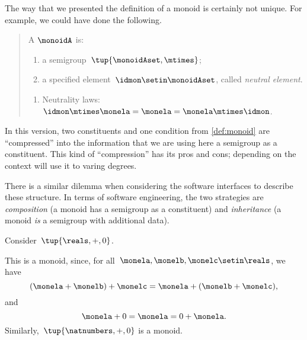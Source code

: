 \begin{remark}
    The way that we presented the definition of a monoid is certainly not unique.
    For example, we could have done the following.
    \begin{quote}
        A \emph{} $\monoidA$ is:
        \begin{body}
            \constit
            \begin{enumerate}
                \item a semigroup~$\tup{\monoidAset, \mtimes}$;
                \item a specified element~$\idmon\setin \monoidAset$, called \emph{neutral element}.
            \end{enumerate}
            \condit
            \begin{enumerate}
                \item Neutrality laws:~$\idmon\mtimes \monela= \monela= \monela \mtimes \idmon$.
            \end{enumerate}
        \end{body}
    \end{quote}
    In this version, two constituents and one condition from \cref{def:monoid} are ``compressed'' into the information that we are using here a semigroup as a constituent.
    This kind of ``compression'' has its pros and cons; depending on the context will use it to varing degrees.

    There is a similar dilemma when considering the software interfaces to describe these structure.
    In terms of software engineering, the two strategies are \emph{composition} (a monoid has a semigroup as a constituent) and \emph{inheritance} (a monoid \emph{is} a semigroup with additional data).

\end{remark}

\begin{example}
    Consider~$\tup{\reals,+,0}$.

    This is a monoid, since, for all~$\monela,\monelb, \monelc \setin \reals$, we have
    \begin{equation*}
        (\monela+\monelb)
        +\monelc=\monela+(\monelb+\monelc),
    \end{equation*}
    and
    \begin{equation*}
        \monela+0=\monela=0+\monela.
    \end{equation*}
    Similarly,~$\tup{\natnumbers, +,0}$ is a monoid.
\end{example}

